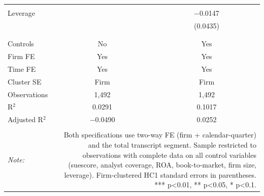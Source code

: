 \begin{table}[!htbp]
\begin{tabular}{@{\extracolsep{5pt}}lcc}
  & & \\ 
 Leverage &  & $-$0.0147 \\ 
  &  & (0.0435) \\ 
  & & \\ 
\hline \\[-1.8ex] 
Controls & No & Yes \\ 
Firm FE & Yes & Yes \\ 
Time FE & Yes & Yes \\ 
Cluster SE & Firm & Firm \\ 
Observations & 1,492 & 1,492 \\ 
R$^{2}$ & 0.0291 & 0.1017 \\ 
Adjusted R$^{2}$ & $-$0.0490 & 0.0252 \\ 
\hline 
\hline \\[-1.8ex] 
\textit{Note:}  & \multicolumn{2}{r}{Both specifications use two-way FE (firm + calendar-quarter) and the total transcript segment. Sample restricted to observations with complete data on all control variables (suescore, analyst coverage, ROA, book-to-market, firm size, leverage). Firm-clustered HC1 standard errors in parentheses. *** p<0.01, ** p<0.05, * p<0.1.} \\ 
\end{tabular} 
\end{table} 
